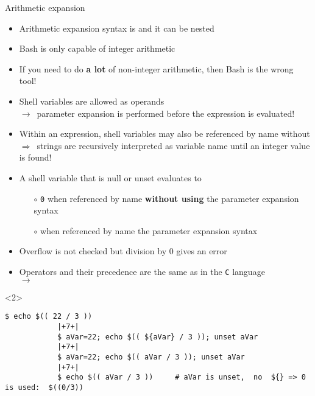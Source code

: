 \begin{frame}[fragile]{Arithmetic expansion}
    \vspace{-3mm}
    \begin{itemize}[<only@1>]
        \item Arithmetic expansion syntax is \PP{\texttt{\$((\ldots))}} and it can be nested
        \item \alert{Bash is only capable of integer arithmetic}
        \item If you need to do \textbf{a lot} of non-integer arithmetic, then Bash is the wrong tool!
        \item Shell variables are allowed as operands\\ $\to\,$ parameter expansion is performed before the expression is evaluated!
        \item Within an expression, shell variables may also be referenced by name without \PP{\texttt{\$\{\ldots\}}}\\
              $\Rightarrow\,$ strings are recursively interpreted as variable name until an integer value is found!
        \item A shell variable that is null or unset evaluates to
              \begin{itemize}
                  \item[$\circ$] \alert{\texttt{0}} when referenced by name \alert{\textbf{without using}} the parameter expansion syntax
                  \item[$\circ$]  when referenced by name  the parameter expansion syntax
              \end{itemize}
        \item Overflow is not checked but division by 0 gives an error
        \item Operators and their precedence are the same as in the \texttt{C} language\\ $\to\,$ 
    \end{itemize}
    \begin{onlyenv}<2>
        \begin{lstlisting}[style=MyBash, style=oddnumbers, style=smaller]
            $ echo $(( 22 / 3 ))
            |+7+|
            $ aVar=22; echo $(( ${aVar} / 3 )); unset aVar
            |+7+|
            $ aVar=22; echo $(( aVar / 3 )); unset aVar
            |+7+|
            $ echo $(( aVar / 3 ))     # aVar is unset,  no  ${} => 0 is used:  $((0/3))

\end{lstlisting}
\end{onlyenv}
\end{frame}
